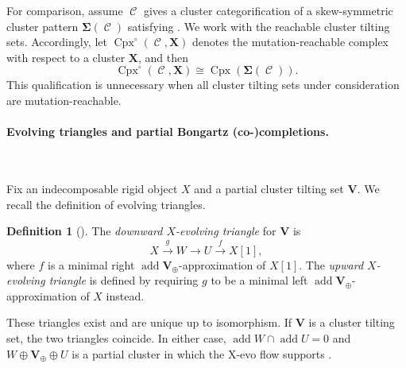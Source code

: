 \documentclass[11pt,reqno]{amsart}
\theoremstyle{plain}
\theoremstyle{definition}
\newtheorem{definition}[theorem]{Definition}
\numberwithin{equation}{section}
\newcommand\hua{\mathcal}
\newcommand\<{\langle}
\renewcommand\>{\rangle}
\newcommand\Add{\operatorname{add}}
\newcommand{\C}{\operatorname{\hua{C}}} %
\newcommand{\on}[1]{\operatorname{#1}}
\def\CCx{\on{Cpx}}   %
\def\vv{\mathbf{v}}
\def\sink{X}
\newcommand{\pcts}[1]{\mathbf{#1}}%
\newcommand{\pcto}[1]{\mathbf{#1}_\oplus} %
\newcommand{\ccpt}[1]{\mathrm{#1}}%
\def\xevo{\ccpt{X}}%
\def\seeds{\mathbf{\Sigma}}
\begin{document}
For comparison, assume $\C$ gives a cluster categorification of a skew-symmetric cluster pattern $\seeds(\C)$ satisfying . 
We work with the reachable cluster tilting sets. 
Accordingly, let $\CCx^{\circ}(\C,\pcts{X})$ denotes the mutation-reachable complex with respect to a cluster $\pcts{X}$, and then
\begin{equation}\label{eq:app-complex}
    \CCx^\circ(\C,\pcts{X})\cong\CCx(\seeds(\C)).
\end{equation}
This qualification is unnecessary when all cluster tilting sets under consideration are mutation-reachable.

\paragraph{\textbf{Evolving triangles and partial Bongartz (co-)completions.}}\

Fix an indecomposable rigid object $X$ and a partial cluster tilting set $\pcts{V}$. 
We recall the definition of evolving triangles.

\begin{definition}[{\cite[Def./Lem.~3.2, Def.~3.5]{QT}}]
\label{def:app-triangle}
The \emph{downward $X$-evolving triangle} for $\pcts{V}$ is
\begin{equation}\label{eq:app-triangle}
    X\xrightarrow{g}W\longrightarrow U\xrightarrow{f}X[1],
\end{equation}
where $f$ is a minimal right $\Add\pcto{V}$-approximation of $X[1]$.
The \emph{upward $X$-evolving triangle} is defined by requiring $g$
to be a minimal left $\Add\pcto{V}$-approximation of $X$ instead.
\end{definition}

These triangles exist and are unique up to isomorphism. 
If $\pcts{V}$ is a cluster tilting set, the two triangles coincide.
In either case, $\Add W\cap\Add U=0$ and
$W\oplus \pcto{V}\oplus U$ is a partial cluster in which the $\xevo$-evo flow supports \cite[Lem.~3.7]{QT}. 
\end{document}
